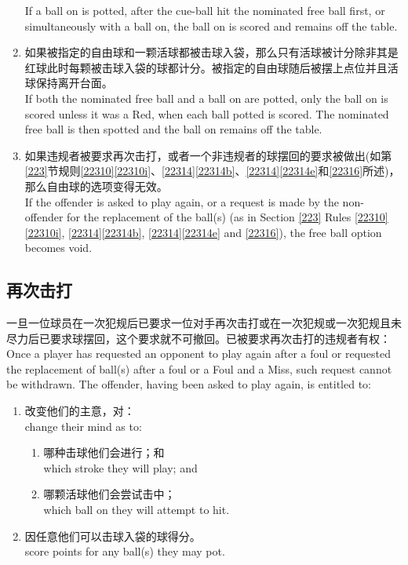 \begin{enumerate}[label=(\alph*)]
    If a ball on is potted, after the cue-ball hit the nominated free ball first, or simultaneously with a ball on, the ball on is scored and remains off the table.
    \item 如果被指定的自由球和一颗活球都被击球入袋，那么只有活球被计分除非其是红球此时每颗被击球入袋的球都计分。被指定的自由球随后被摆上点位并且活球保持离开台面。\\
    If both the nominated free ball and a ball on are potted, only the ball on is scored unless it was a Red, when each ball potted is scored. The nominated free ball is then spotted and the ball on remains off the table.
    \item 如果违规者被要求再次击打，或者一个非违规者的球摆回的要求被做出(如第\ref{223}节规则\ref{22310}\ref{22310i}、\ref{22314}\ref{22314b}、\ref{22314}\ref{22314e}和\ref{22316}所述)，那么自由球的选项变得无效。\\
    If the offender is asked to play again, or a request is made by the non-offender for the replacement of the ball(s) (as in Section \ref{223} Rules \ref{22310}\ref{22310i}, \ref{22314}\ref{22314b}, \ref{22314}\ref{22314e} and \ref{22316}), the free ball option becomes void.
\end{enumerate}

\subsection{再次击打}

\noindent 一旦一位球员在一次犯规后已要求一位对手再次击打或在一次犯规或一次犯规且未尽力后已要求球摆回，这个要求就不可撤回。已被要求再次击打的违规者有权：\\
Once a player has requested an opponent to play again after a foul or requested the replacement of ball(s) after a foul or a Foul and a Miss, such request cannot be withdrawn. The offender, having been asked to play again, is entitled to:
\begin{enumerate}[label=(\alph*)]
    \item 改变他们的主意，对：\\
    change their mind as to:
    \begin{enumerate}[label=(\roman*)]
        \item 哪种击球他们会进行；和\\
        which stroke they will play; and
        \item 哪颗活球他们会尝试击中；\\
        which ball on they will attempt to hit.
    \end{enumerate}
    \item 因任意他们可以击球入袋的球得分。\\
    score points for any ball(s) they may pot.
\end{enumerate}

